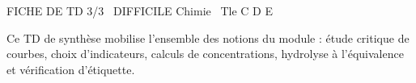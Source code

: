 \documentclass[11pt]{article}
\begin{document}
\begin{tcolorbox}[enhanced,colback=popink,colframe=popink,arc=10pt,boxrule=0pt,left=12pt,right=12pt,top=9pt,bottom=9pt]
{\color{white}\popxbold\small FICHE DE TD 3/3 \textbullet\ DIFFICILE \hfill Chimie \textbullet\ Tle C D E\par}
\end{tcolorbox}
\vspace{4pt}
Ce TD de synthèse mobilise l'ensemble des notions du module : étude critique de courbes, choix d'indicateurs, calculs de concentrations, hydrolyse à l'équivalence et vérification d'étiquette.
\end{document}

